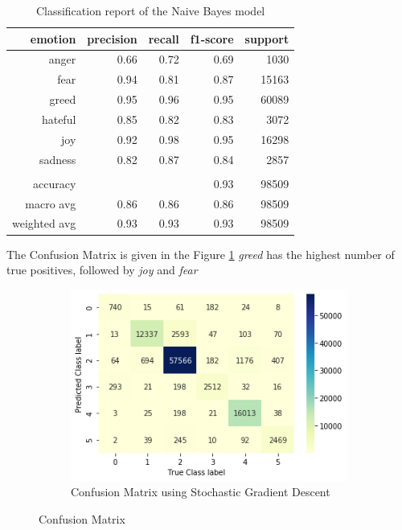 \documentclass[a4paper, 12pt]{article}
\begin{document}
\begin{table}[h]
\begin{center}
    \begin{tabular}{| r | r | r | r | r | }
        \hline
      emotion & precision & recall & f1-score & support \\ \hline
      anger    & 0.66  & 0.72     & 0.69   		& 1030    \\ \hline
			fear		& 0.94     & 0.81     & 0.87   & 15163 \\ \hline
      greed    & 0.95     & 0.96     & 0.95   & 60089 \\ \hline
      hateful    & 0.85     & 0.82     & 0.83   & 3072 \\ \hline
      joy       & 0.92  	&0.98     & 0.95    & 16298 \\ \hline
      sadness    & 0.82    & 0.87     & 0.84  & 2857  \\ \hline
									 &      &        &           &     \\ \hline
      accuracy     &   			&   		 		& 0.93  &98509    \\ \hline
      macro avg     & 0.86   &0.86        & 0.86  &98509   \\ \hline
		  weighted avg & 0.93   &0.93       & 0.93   &98509  \\ \hline
    \end{tabular}
    \caption{Classification report of the Naive Bayes model}
    \label{tab:cr4}
\end{center}
\end{table}

The Confusion Matrix is given in the Figure \ref{fig:con_sgd}
\textit{greed} has the highest number of true positives, followed by \textit{joy} and \textit{fear}
 
\begin{figure}[H]
    \centering
    \begin{subfigure}[a]{0.48\textwidth}
        \includegraphics[width=\textwidth]{res/con_sgd.png}
        \caption{Confusion Matrix using Stochastic Gradient Descent}
    \end{subfigure}
		\caption{Confusion Matrix}
		\label{fig:con_sgd}
\end{figure}
\end{document}
